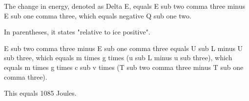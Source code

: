 The change in energy, denoted as Delta E, equals E sub two comma three minus E sub one comma three, which equals negative Q sub one two.

In parentheses, it states "relative to ice positive".

E sub two comma three minus E sub one comma three equals U sub L minus U sub three, which equals m times g times (u sub L minus u sub three), which equals m times g times c sub v times (T sub two comma three minus T sub one comma three).

This equals 1085 Joules.